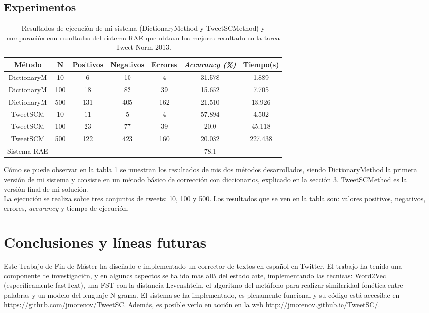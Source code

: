 \documentclass[spanish,12pt, a4paper,twoside]{paper}
\let\oldsection\section
\def\section{\cleardoublepage\oldsection}
\begin{document}
\subsection{Experimentos}\label{sec:experimentos}
\begin{table}[htb]
\centering
\begin{tabular}{|c|c|c|c|c|c|c|}
\hline 
\textbf{Método} & \textbf{N} & \textbf{Positivos} & \textbf{Negativos} & \textbf{Errores} & \textbf{\textit{Accurancy (\%)}} & \textbf{Tiempo(s)} \\ 
\hline 
DictionaryM & 10 & 6 & 10 & 4 & 31.578 & 1.889 \\ 
\hline 
DictionaryM & 100 & 18 & 82 & 39 & 15.652 & 7.705 \\ 
\hline 
DictionaryM & 500 & 131 & 405 & 162 & 21.510 & 18.926 \\ 
\hline 
TweetSCM & 10 & 11 & 5 & 4 & 57.894 & 4.502 \\ 
\hline 
TweetSCM & 100 & 23 & 77 & 39 & 20.0 & 45.118 \\ 
\hline 
TweetSCM & 500 & 122 & 423 & 160 & 20.032 & 227.438 \\ 
\hline 
Sistema RAE & - & - & - & - & 78.1 & - \\ 
\hline 
\end{tabular}
\caption{Resultados de ejecución de mi sistema (DictionaryMethod y TweetSCMethod) y comparación con resultados del sistema RAE \cite{porta:2013} que obtuvo los mejores resultado en la tarea Tweet Norm 2013\cite{alegria:2013}.}
\label{table:results}
\end{table}

Cómo se puede observar en la tabla \ref{table:results} se muestran los resultados de mis dos métodos desarrollados, siendo DictionaryMethod la primera versión de mi sistema y consiste en un método básico de corrección con diccionarios, explicado en la \hyperref[sec:solucionpropuesta]{sección 3}. TweetSCMethod es la versión final de mi solución.\\

La ejecución se realiza sobre tres conjuntos de tweets: 10, 100 y 500. Los resultados que se ven en la tabla son: valores positivos, negativos, errores, \textit{accurancy} y tiempo de ejecución.

\section{Conclusiones y líneas futuras}\label{sec:conclusiones}
Este Trabajo de Fin de Máster ha diseñado e implementado un corrector de textos en español en Twitter. El trabajo ha tenido una componente de investigación, y en algunos aspectos se ha ido más allá del estado arte, implementando las técnicas: Word2Vec (específicamente fastText), una FST con la distancia Levenshtein, el algoritmo del metáfono para realizar similaridad fonética entre palabras y un modelo del lenguaje N-grama. El sistema se ha implementado, es plenamente funcional y su código está accesible en \url{https://github.com/jmorenov/TweetSC}. Además, es posible verlo en acción en la web \url{http://jmorenov.github.io/TweetSC/}.\\
\end{document}
